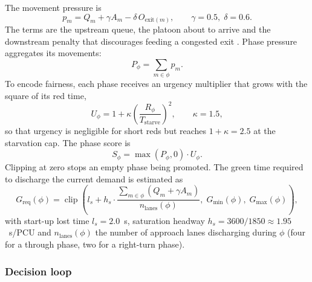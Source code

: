 The movement pressure is
\begin{equation}
  p_m = Q_m + \gamma A_m - \delta\, O_{\text{exit}(m)}, \qquad \gamma = 0.5,\; \delta = 0.6.
  \label{eq:pressure}
\end{equation}
The terms are the upstream queue, the platoon about to arrive and the downstream penalty that discourages feeding a congested exit
\cite{gregoire2015capacity}. Phase pressure aggregates its movements:
\begin{equation}
  P_\phi = \sum_{m \in \phi} p_m .
  \label{eq:phase-pressure}
\end{equation}
To encode fairness, each phase receives an urgency multiplier that grows with the square of its red
time,
\begin{equation}
  U_\phi = 1 + \kappa \left( \frac{R_\phi}{T_{\text{starve}}} \right)^{2}, \qquad \kappa = 1.5,
  \label{eq:urgency}
\end{equation}
so that urgency is negligible for short reds but reaches $1+\kappa = 2.5$ at the starvation cap. The
phase score is
\begin{equation}
  S_\phi = \max(P_\phi, 0)\cdot U_\phi .
  \label{eq:score}
\end{equation}
Clipping at zero stops an empty phase being promoted. The green time required to discharge the current demand is estimated as
\begin{equation}
  G_{\text{req}}(\phi) = \operatorname{clip}\!\left( l_s + h_s \cdot
  \frac{\sum_{m \in \phi} (Q_m + \gamma A_m)}{n_{\text{lanes}}(\phi)},\; G_{\min}(\phi),\; G_{\max}(\phi) \right),
  \label{eq:greq}
\end{equation}
with start-up lost time $l_s = 2.0$~s, saturation headway $h_s = 3600/1850 \approx 1.95$~s/PCU and
$n_{\text{lanes}}(\phi)$ the number of approach lanes discharging during $\phi$ (four for a through
phase, two for a right-turn phase).

\subsubsection{Decision loop}

